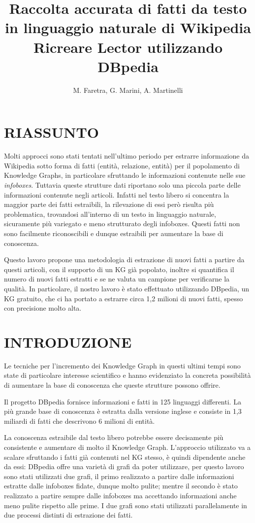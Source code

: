 \documentclass[10pt,a4paper,twocolumn]{article}
\author{M. Faretra, G. Marini, A. Martinelli}
\title{\textbf{Raccolta accurata di fatti da testo in linguaggio naturale di Wikipedia}\\Ricreare Lector utilizzando DBpedia}
\begin{document}
	
\maketitle
\thispagestyle{empty}
\pagestyle{empty}
		
\section*{RIASSUNTO}
		
Molti approcci sono stati tentati nell'ultimo periodo per estrarre informazione da Wikipedia sotto forma di fatti (entità, relazione, entità) per il popolamento di Knowledge Graphs, in particolare sfruttando le informazioni contenute nelle sue \textit{infoboxes}. Tuttavia queste strutture dati riportano solo una piccola parte delle informazioni contenute negli articoli. Infatti nel testo libero si concentra la maggior parte dei fatti estraibili, la rilevazione di essi però risulta più problematica, trovandosi all'interno di un testo in linguaggio naturale, sicuramente più variegato e meno strutturato degli infoboxes. Questi fatti non sono facilmente riconoscibili e dunque estraibili per aumentare la base di conoscenza. 

Questo lavoro propone una metodologia di estrazione di nuovi fatti a partire da questi articoli, con il supporto di un KG già popolato, inoltre si quantifica il numero di nuovi fatti estratti e se ne valuta un campione per verificarne la qualità. In particolare, il nostro lavoro è stato effettuato utilizzando DBpedia, un KG gratuito, che ci ha portato a estrarre circa 1,2 milioni di nuovi fatti, spesso con precisione molto alta.

\section{INTRODUZIONE} 

Le tecniche per l'incremento dei Knowledge Graph in questi ultimi tempi sono state di particolare interesse scientifico e hanno evidenziato la concreta possibilità di aumentare la base di conoscenza che queste strutture possono offrire.

Il progetto DBpedia fornisce informazioni e fatti in 125 linguaggi differenti. La più grande base di conoscenza è estratta dalla versione inglese e consiste in 1,3 miliardi di fatti che descrivono 6 milioni di entità. 

La conoscenza estraibile dal testo libero potrebbe essere decisamente più consistente e aumentare di molto il Knowledge Graph. L'approccio utilizzato va a scalare sfruttando i fatti già contenuti nel KG stesso, è quindi dipendente anche da essi: DBpedia offre una varietà di grafi da poter utilizzare, per questo lavoro sono stati utilizzati due grafi, il primo realizzato a partire dalle informazioni estratte dalle infoboxes fidate, dunque molto pulite; mentre il secondo è stato realizzato a partire sempre dalle infoboxes ma accettando informazioni anche meno pulite rispetto alle prime. I due grafi sono stati utilizzati parallelamente in due processi distinti di estrazione dei fatti.
\end{document}

